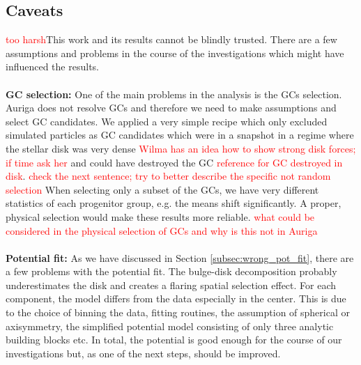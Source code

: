 \subsection{Caveats}
\textcolor{red}{too harsh}This work and its results cannot be blindly trusted. There are a few assumptions and problems in the course of the investigations which might have influenced the results.
\\\\\textbf{GC selection:}
One of the main problems in the analysis is the \acp{GC} selection. Auriga does not resolve \acp{GC} and therefore we need to make assumptions and select \ac{GC} candidates. We applied a very simple recipe which only excluded simulated particles as \ac{GC} candidates which were in a snapshot in a regime where the stellar disk was very dense \textcolor{red}{Wilma has an idea how to show strong disk forces; if time ask her} and could have destroyed the \ac{GC} \textcolor{red}{reference for GC destroyed in disk}. \textcolor{red}{check the next sentence; try to better describe the specific not random selection} When selecting only a subset of the \acp{GC}, we have very different statistics of each progenitor group, e.g. the means shift significantly. A proper, physical selection would make these results more reliable. \textcolor{red}{what could be considered in the physical selection of GCs and why is this not in Auriga}
\\\\\textbf{Potential fit:}
As we have discussed in Section \ref{subsec:wrong_pot_fit}, there are a few problems with the potential fit. The bulge-disk decomposition probably underestimates the disk and creates a flaring spatial selection effect. For each component, the model differs from the data especially in the center. This is due to the choice of binning the data, fitting routines, the assumption of spherical or axisymmetry, the simplified potential model consisting of only three analytic building blocks etc. In total, the potential is good enough for the course of our investigations but, as one of the next steps, should be improved.

